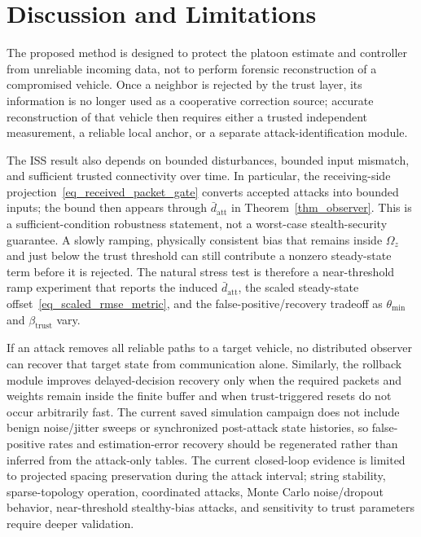 \documentclass[letterpaper,journal]{IEEEtran}
\begin{document}

\section{Discussion and Limitations}\label{sec_discussion}
The proposed method is designed to protect the platoon estimate and controller from unreliable incoming data, not to perform forensic reconstruction of a compromised vehicle. Once a neighbor is rejected by the trust layer, its information is no longer used as a cooperative correction source; accurate reconstruction of that vehicle then requires either a trusted independent measurement, a reliable local anchor, or a separate attack-identification module.

The ISS result also depends on bounded disturbances, bounded input mismatch, and sufficient trusted connectivity over time. In particular, the receiving-side projection~\eqref{eq_received_packet_gate} converts accepted attacks into bounded inputs; the bound then appears through $\bar d_{\mathrm{att}}$ in Theorem~\ref{thm_observer}. This is a sufficient-condition robustness statement, not a worst-case stealth-security guarantee. A slowly ramping, physically consistent bias that remains inside $\Omega_z$ and just below the trust threshold can still contribute a nonzero steady-state term before it is rejected. The natural stress test is therefore a near-threshold ramp experiment that reports the induced $\bar d_{\mathrm{att}}$, the scaled steady-state offset~\eqref{eq_scaled_rmse_metric}, and the false-positive/recovery tradeoff as $\theta_{\min}$ and $\beta_{\text{trust}}$ vary.

If an attack removes all reliable paths to a target vehicle, no distributed observer can recover that target state from communication alone. Similarly, the rollback module improves delayed-decision recovery only when the required packets and weights remain inside the finite buffer and when trust-triggered resets do not occur arbitrarily fast. The current saved simulation campaign does not include benign noise/jitter sweeps or synchronized post-attack state histories, so false-positive rates and estimation-error recovery should be regenerated rather than inferred from the attack-only tables. The current closed-loop evidence is limited to projected spacing preservation during the attack interval; string stability, sparse-topology operation, coordinated attacks, Monte Carlo noise/dropout behavior, near-threshold stealthy-bias attacks, and sensitivity to trust parameters require deeper validation.
\end{document}
